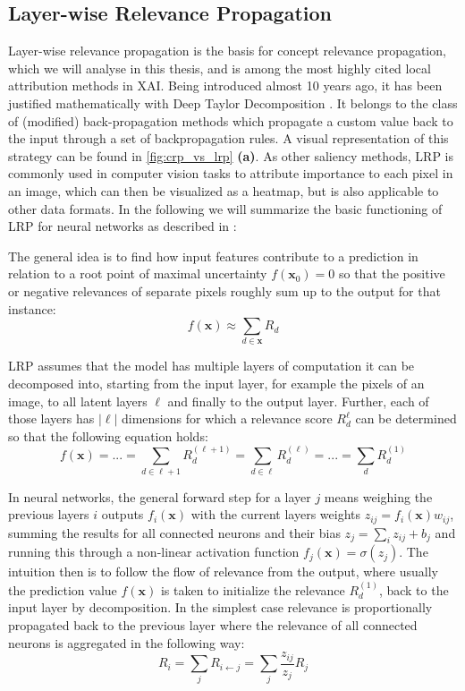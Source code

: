 \subsection{Layer-wise Relevance Propagation}\label{section:lrp}
Layer-wise relevance propagation \cite{Bach2015} is the basis for concept relevance propagation, which we will analyse in this thesis, and is among the most highly cited local attribution methods in XAI. Being introduced almost 10 years ago, it has been justified mathematically with Deep Taylor Decomposition \cite{Montavon2017}. It belongs to the class of (modified) back-propagation methods which propagate a custom value back to the input through a set of backpropagation rules. A visual representation of this strategy can be found in \cref{fig:crp_vs_lrp} \textbf{(a)}. As other saliency methods, LRP is commonly used in computer vision tasks to attribute importance to each pixel in an image, which can then be visualized as a heatmap, but is also applicable to other data formats. In the following we will summarize the basic functioning of LRP for neural networks as described in \cite{Bach2015}:

The general idea is to find how input features contribute to a prediction in relation to a root point of maximal uncertainty $f(\mathbf{x}_0) = 0$ so that the positive or negative relevances of separate pixels roughly sum up to the output for that instance:
\begin{equation}\displaystyle
    f(\mathbf{x}) \approx \sum_{d \in \mathbf{x}} R_d
\end{equation}

LRP assumes that the model has multiple layers of computation it can be decomposed into, starting from the input layer, for example the pixels of an image, to all latent layers $\ell$ and finally to the output layer. Further, each of those layers has $|\ell|$ dimensions for which a relevance score $R^{\ell}_d$ can be determined so that the following equation holds:
\begin{equation}
    f(\mathbf{x}) = ... = \sum_{d \in \ell+1} R^{(\ell+1)}_d =  \sum_{d \in \ell} R^{(\ell)}_d = ... =  \sum_{d} R^{(1)}_d
\end{equation}

In neural networks, the general forward step for a layer $j$ means weighing the previous layers $i$ outputs $f_i(\mathbf{x})$ with the current layers weights $z_{ij} = f_i(\mathbf{x}) w_{ij}$, summing the results for all connected neurons and their bias $z_{j} = \sum_{i} z_{ij} + b_j$ and running this through a non-linear activation function $f_j(\mathbf{x}) = \sigma (z_j)$.
The intuition then is to follow the flow of relevance from the output, where usually the prediction value $f(\mathbf{x})$ is taken to initialize the relevance $R^(1)_d$, back to the input layer by decomposition. In the simplest case relevance is proportionally propagated back to the previous layer where the relevance of all connected neurons is aggregated in the following way:
\begin{equation}
    R_i = \sum_{j}  R_{i \leftarrow j} = \sum_{j} \frac{z_{ij}}{z_j} R_j
\end{equation}

